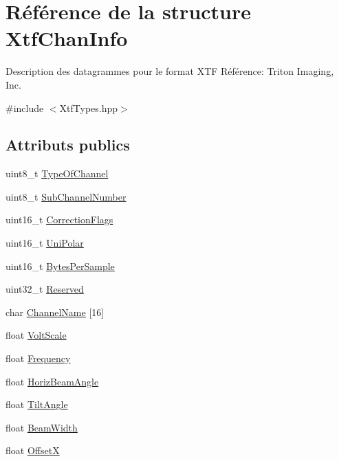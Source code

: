 \hypertarget{structXtfChanInfo}{}\section{Référence de la structure Xtf\+Chan\+Info}
\label{structXtfChanInfo}


Description des datagrammes pour le format X\+TF Référence\+: Triton Imaging, Inc.  




{\ttfamily \#include $<$Xtf\+Types.\+hpp$>$}

\subsection*{Attributs publics}
\begin{DoxyCompactItemize}
\item 
uint8\+\_\+t \hyperlink{structXtfChanInfo_af42e4c36965fc0efc6f318eae8543544}{Type\+Of\+Channel}
\item 
uint8\+\_\+t \hyperlink{structXtfChanInfo_a02056d912b401e40bd7941672a810c53}{Sub\+Channel\+Number}
\item 
uint16\+\_\+t \hyperlink{structXtfChanInfo_a4c4ef5b9d40e1b2ab67aad28b1e70d87}{Correction\+Flags}
\item 
uint16\+\_\+t \hyperlink{structXtfChanInfo_ad91cf319970450f2bfe4d0e3c89f126b}{Uni\+Polar}
\item 
uint16\+\_\+t \hyperlink{structXtfChanInfo_af86ec7b731ff897f7f05488390e0b764}{Bytes\+Per\+Sample}
\item 
uint32\+\_\+t \hyperlink{structXtfChanInfo_a23af16239a5bf74cdd845ec79924a499}{Reserved}
\item 
char \hyperlink{structXtfChanInfo_a37dbfffb78630b3df5c9a0018a3598de}{Channel\+Name} \mbox{[}16\mbox{]}
\item 
float \hyperlink{structXtfChanInfo_ab766670e0c7144c4c414b3f3bd2495d2}{Volt\+Scale}
\item 
float \hyperlink{structXtfChanInfo_a273eaa4002fa23b55f0487c95943e1b2}{Frequency}
\item 
float \hyperlink{structXtfChanInfo_af99ab70887b6253e81765e68cb87c731}{Horiz\+Beam\+Angle}
\item 
float \hyperlink{structXtfChanInfo_a6ea9bfb24ab594155f37f96ad805aabb}{Tilt\+Angle}
\item 
float \hyperlink{structXtfChanInfo_a9354d8fb4f2e0e24133e42779d9af1cc}{Beam\+Width}
\item 
float \hyperlink{structXtfChanInfo_a27eea536347fd61c1062a322d7d42a59}{OffsetX}

\end{DoxyCompactItemize}
